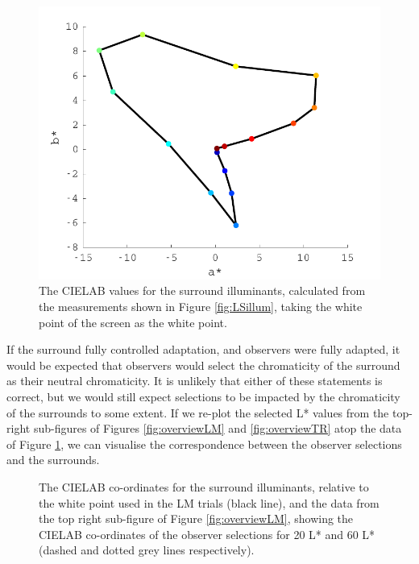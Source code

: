 \begin{figure}[htbp]
\includegraphics[max width=\textwidth]{figs/LargeSphere/adapter1.pdf}
\caption{The CIELAB values for the surround illuminants, calculated from the measurements shown in Figure \ref{fig:LSillum}, taking the white point of the screen as the white point.}
\label{fig:adapter1}
\end{figure}

If the surround fully controlled adaptation, and observers were fully adapted, it would be expected that observers would select the chromaticity of the surround as their neutral chromaticity. It is unlikely that either of these statements is correct, but we would still expect selections to be impacted by the chromaticity of the surrounds to some extent. If we re-plot the selected L* values from the top-right sub-figures of Figures \ref{fig:overviewLM} and \ref{fig:overviewTR} atop the data of Figure \ref{fig:adapter1}, we can visualise the correspondence between the observer selections and the surrounds.

\begin{figure}[htbp]
\caption{The CIELAB co-ordinates for the surround illuminants, relative to the white point used in the LM trials (black line), and the data from the top right sub-figure of Figure \ref{fig:overviewLM}, showing the CIELAB co-ordinates of the observer selections for 20 L* and 60 L* (dashed and dotted grey lines respectively).}
\label{fig:LMCompSurr}
\end{figure}

